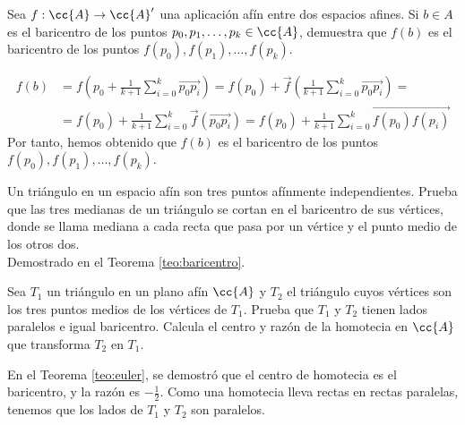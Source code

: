 \begin{ejercicio}
    Sea $f : \cc{A} \to \cc{A}'$ una aplicación afín entre dos espacios afines. Si $b \in A$ es el baricentro de los puntos $p_0, p_1, \dots , p_k \in \cc{A}$, demuestra que $f (b)$ es el baricentro de los puntos $f (p_0), f (p_1), \dots , f (p_k)$.

    \begin{equation*}
        \begin{split}
            f(b) &= f\left(p_0+\frac{1}{k+1}\sum_{i=0}^k \vec{p_0p_i}\right) = f(p_0)+\vec{f}\left(\frac{1}{k+1}\sum_{i=0}^k \vec{p_0p_i}\right) =\\
            &= f(p_0)+\frac{1}{k+1}\sum_{i=0}^k \vec{f}(\vec{p_0p_i}) = f(p_0)+\frac{1}{k+1}\sum_{i=0}^k \vec{f(p_0)f(p_i)}
        \end{split}
    \end{equation*}
    Por tanto, hemos obtenido que $f(b)$ es el baricentro de los puntos $f(p_0), f(p_1), \dots , f(p_k)$.
\end{ejercicio}

\begin{ejercicio}
    Un triángulo en un espacio afín son tres puntos afínmente independientes. Prueba que las tres medianas de un triángulo se cortan en el baricentro de sus vértices, donde se llama mediana a cada recta que pasa por un vértice y el punto medio de los otros dos.\\

    Demostrado en el Teorema \ref{teo:baricentro}.
\end{ejercicio}

\begin{ejercicio}
    Sea $T_1$ un triángulo en un plano afín $\cc{A}$ y $T_2$ el triángulo cuyos vértices son los tres puntos medios de los vértices de $T_1$. Prueba que $T_1$ y $T_2$ tienen lados paralelos e igual baricentro. Calcula el centro y razón de la homotecia en $\cc{A}$ que transforma $T_2$ en $T_1$.

    En el Teorema \ref{teo:euler}, se demostró que el centro de homotecia es el baricentro, y la razón es $-\frac{1}{2}$.
    Como una homotecia lleva rectas en rectas paralelas, tenemos que los lados de $T_1$ y $T_2$ son paralelos.
\end{ejercicio}

